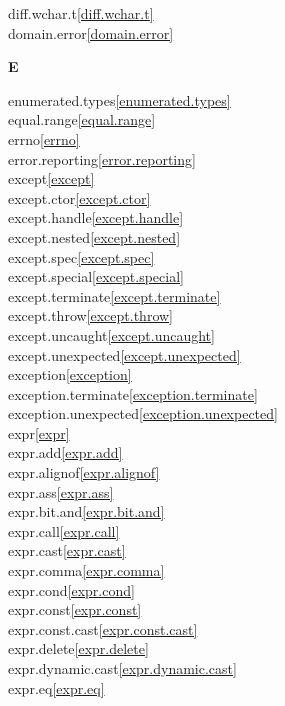 \begin{multicols}{2}
diff.wchar.t\quad\ref{diff.wchar.t}\\
domain.error\quad\ref{domain.error}\\
\par \textbf{E}\par
enumerated.types\quad\ref{enumerated.types}\\
equal.range\quad\ref{equal.range}\\
errno\quad\ref{errno}\\
error.reporting\quad\ref{error.reporting}\\
except\quad\ref{except}\\
except.ctor\quad\ref{except.ctor}\\
except.handle\quad\ref{except.handle}\\
except.nested\quad\ref{except.nested}\\
except.spec\quad\ref{except.spec}\\
except.special\quad\ref{except.special}\\
except.terminate\quad\ref{except.terminate}\\
except.throw\quad\ref{except.throw}\\
except.uncaught\quad\ref{except.uncaught}\\
except.unexpected\quad\ref{except.unexpected}\\
exception\quad\ref{exception}\\
exception.terminate\quad\ref{exception.terminate}\\
exception.unexpected\quad\ref{exception.unexpected}\\
expr\quad\ref{expr}\\
expr.add\quad\ref{expr.add}\\
expr.alignof\quad\ref{expr.alignof}\\
expr.ass\quad\ref{expr.ass}\\
expr.bit.and\quad\ref{expr.bit.and}\\
expr.call\quad\ref{expr.call}\\
expr.cast\quad\ref{expr.cast}\\
expr.comma\quad\ref{expr.comma}\\
expr.cond\quad\ref{expr.cond}\\
expr.const\quad\ref{expr.const}\\
expr.const.cast\quad\ref{expr.const.cast}\\
expr.delete\quad\ref{expr.delete}\\
expr.dynamic.cast\quad\ref{expr.dynamic.cast}\\
expr.eq\quad\ref{expr.eq}\\

\end{multicols}
